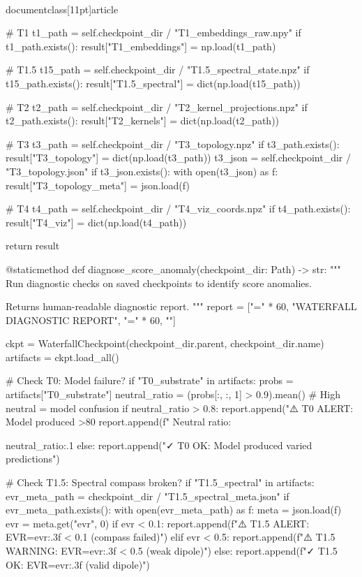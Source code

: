 \\documentclass[11pt]{article}
\begin{document}
\begin{CodeBlock}
        # T1
        t1_path = self.checkpoint_dir / "T1_embeddings_raw.npy"
        if t1_path.exists():
            result["T1_embeddings"] = np.load(t1_path)

        # T1.5
        t15_path = self.checkpoint_dir / "T1.5_spectral_state.npz"
        if t15_path.exists():
            result["T1.5_spectral"] = dict(np.load(t15_path))

        # T2
        t2_path = self.checkpoint_dir / "T2_kernel_projections.npz"
        if t2_path.exists():
            result["T2_kernels"] = dict(np.load(t2_path))

        # T3
        t3_path = self.checkpoint_dir / "T3_topology.npz"
        if t3_path.exists():
            result["T3_topology"] = dict(np.load(t3_path))
        t3_json = self.checkpoint_dir / "T3_topology.json"
        if t3_json.exists():
            with open(t3_json) as f:
                result["T3_topology_meta"] = json.load(f)

        # T4
        t4_path = self.checkpoint_dir / "T4_viz_coords.npz"
        if t4_path.exists():
            result["T4_viz"] = dict(np.load(t4_path))

        return result

    @staticmethod
    def diagnose_score_anomaly(checkpoint_dir: Path) -> str:
        """
        Run diagnostic checks on saved checkpoints to identify score anomalies.

        Returns human-readable diagnostic report.
        """
        report = ["=" * 60, "WATERFALL DIAGNOSTIC REPORT", "=" * 60, ""]

        ckpt = WaterfallCheckpoint(checkpoint_dir.parent, checkpoint_dir.name)
        artifacts = ckpt.load_all()

        # Check T0: Model failure?
        if "T0_substrate" in artifacts:
            probs = artifacts["T0_substrate"]
            neutral_ratio = (probs[:, :, 1] > 0.9).mean()  # High neutral = model confusion
            if neutral_ratio > 0.8:
                report.append("⚠️  T0 ALERT: Model produced >80%
                report.append(f"   Neutral ratio: {neutral_ratio:.1%
            else:
                report.append("✓  T0 OK: Model produced varied predictions")

        # Check T1.5: Spectral compass broken?
        if "T1.5_spectral" in artifacts:
            evr_meta_path = checkpoint_dir / "T1.5_spectral_meta.json"
            if evr_meta_path.exists():
                with open(evr_meta_path) as f:
                    meta = json.load(f)
                evr = meta.get("evr", 0)
                if evr < 0.1:
                    report.append(f"⚠️  T1.5 ALERT: EVR={evr:.3f} < 0.1 (compass failed)")
                elif evr < 0.5:
                    report.append(f"⚠️  T1.5 WARNING: EVR={evr:.3f} < 0.5 (weak dipole)")
                else:
                    report.append(f"✓  T1.5 OK: EVR={evr:.3f} (valid dipole)")

}
\end{CodeBlock}
\end{document}

